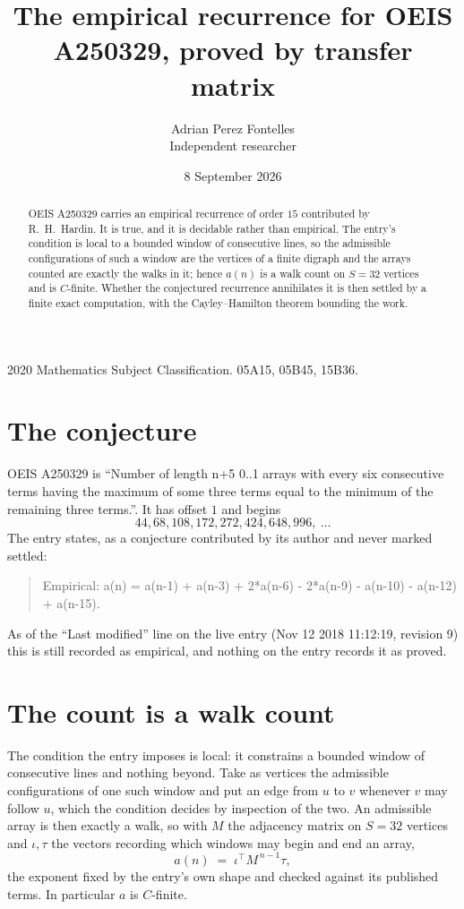 \documentclass[11pt,a4paper]{article}
\title{The empirical recurrence for OEIS A250329, proved by transfer matrix}
\author{Adrian Perez Fontelles\\ \small Independent researcher}
\date{8 September 2026}
\theoremstyle{plain}
\theoremstyle{definition}
\begin{document}
\maketitle

\begin{abstract}
OEIS A250329 carries an empirical recurrence of order $15$ contributed by R.~H.~Hardin. It is
true, and it is decidable rather than empirical. The entry's condition is local to a bounded window of consecutive lines, so
the admissible configurations of such a window are the vertices of a finite digraph and the
arrays counted are exactly the walks in it; hence $a(n)$ is a walk count on $S=32$ vertices
and is $C$-finite. Whether the conjectured recurrence annihilates it is then settled by a
finite exact computation, with the Cayley--Hamilton theorem bounding the work.
\end{abstract}

\noindent\small 2020 Mathematics Subject Classification. 05A15, 05B45, 15B36.\normalsize

\section{The conjecture}

OEIS A250329 is ``Number of length n+5 0..1 arrays with every six consecutive terms having the maximum of some three terms equal to the minimum of the remaining three terms.''. It has offset $1$ and begins
\[
44, 68, 108, 172, 272, 424, 648, 996,\ \dots
\]
The entry states, as a conjecture contributed by its author and never marked settled:
\begin{quote}
Empirical: a(n) = a(n-1) + a(n-3) + 2*a(n-6) - 2*a(n-9) - a(n-10) - a(n-12) + a(n-15).
\end{quote}
As of the ``Last modified'' line on the live entry (Nov 12 2018 11:12:19, revision 9) this is still
recorded as empirical, and nothing on the entry records it as proved.

\section{The count is a walk count}

The condition the entry imposes is local: it constrains a bounded window of consecutive lines and nothing beyond. Take as
vertices the admissible configurations of one such window and put an edge from $u$ to $v$
whenever $v$ may follow $u$, which the condition decides by inspection of the two. An
admissible array is then exactly a walk, so with $M$ the adjacency matrix on $S=32$ vertices
and $\iota,\tau$ the vectors recording which windows may begin and end an array,
\[
a(n)\;=\;\iota^{\!\top}M^{\,n-1}\tau ,
\]
the exponent fixed by the entry's own shape and checked against its published terms. In
particular $a$ is $C$-finite.
\end{document}
